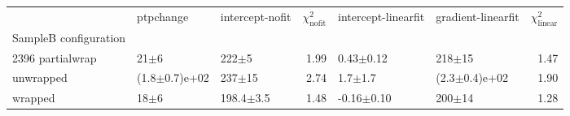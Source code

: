 \begin{tabular}{lllrllr}
\hline
{} &          ptpchange & intercept-nofit &  $\chi^2_\text{nofit}$ & intercept-linearfit & gradient-linearfit &  $\chi^2_\text{linear}$ \\
SampleB configuration &                    &                 &                        &                     &                    &                         \\
\hline
2396    partialwrap   &           21$\pm$6 &       222$\pm$5 &                   1.99 &       0.43$\pm$0.12 &         218$\pm$15 &                    1.47 \\
        unwrapped     &  (1.8$\pm$0.7)e+02 &      237$\pm$15 &                   2.74 &         1.7$\pm$1.7 &  (2.3$\pm$0.4)e+02 &                    1.90 \\
        wrapped       &           18$\pm$6 &   198.4$\pm$3.5 &                   1.48 &      -0.16$\pm$0.10 &         200$\pm$14 &                    1.28 \\
\hline
\end{tabular}